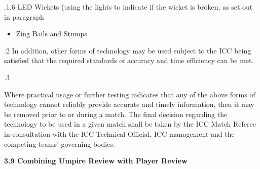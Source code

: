 \documentclass[12pt]{article}
\begin{document}
\vspace{\baselineskip}
\begin{adjustwidth}{0.49in}{0.0in}
{\fontsize{9pt}{10.8pt}.1.6 \tabto{1.17in} LED Wickets (using the lights to indicate if the wicket is broken, as set out in paragraph \par}\par

\end{adjustwidth}


\vspace{\baselineskip}
\begin{itemize}
	\item {\fontsize{9pt}{10.8pt}\selectfont Zing Bails and Stumps\par}
\end{itemize}\par


\vspace{\baselineskip}
\begin{adjustwidth}{0.5in}{0.39in}
{\fontsize{9pt}{10.8pt}.2 \tabto{0.49in} In addition, other forms of technology may be used subject to the ICC being satisfied that the required standards of accuracy and time efficiency can be met.\par}\par

\end{adjustwidth}


\vspace{\baselineskip}
\begin{adjustwidth}{0.5in}{0.1in}
{\fontsize{9pt}{10.8pt}.3 \tabto{0.49in} {\fontsize{8pt}{9.6pt}\selectfont Where practical usage or further testing indicates that any of the above forms of technology cannot reliably provide accurate and timely information, then it may be removed prior to or during a match. The final decision regarding the technology to be used in a given match shall be taken by the ICC Match Referee in consultation with the ICC Technical Official, ICC management and the competing teams’ governing bodies.\par}\par}\par

\end{adjustwidth}


\vspace{\baselineskip}
{\fontsize{11pt}{13.2pt}\selectfont \textbf{3.9 \tabto{0.47in} Combining Umpire Review with Player Review}\par}\par
\end{document}
